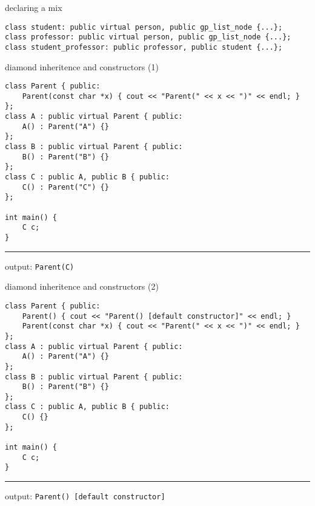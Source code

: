 \begin{frame}[fragile,label=declareMix]{declaring a mix}
\lstset{language=C++,style=smaller}
\begin{lstlisting}
class student: public virtual person, public gp_list_node {...};
class professor: public virtual person, public gp_list_node {...};
class student_professor: public professor, public student {...};
\end{lstlisting}
\end{frame}

\begin{frame}[fragile,label=diamondConstruct1]{diamond inheritence and constructors (1)}
\begin{lstlisting}
class Parent { public:
    Parent(const char *x) { cout << "Parent(" << x << ")" << endl; }
};
class A : public virtual Parent { public:
    A() : Parent("A") {}
};
class B : public virtual Parent { public:
    B() : Parent("B") {}
}; 
class C : public A, public B { public:
    C() : Parent("C") {}
}; 

int main() {
    C c;
}
\end{lstlisting}
\hrule
output: \texttt{Parent(C)}
\end{frame}

\begin{frame}[fragile,label=diamondConstruct2]{diamond inheritence and constructors (2)}
\begin{lstlisting}
class Parent { public:
    Parent() { cout << "Parent() [default constructor]" << endl; }
    Parent(const char *x) { cout << "Parent(" << x << ")" << endl; }
};
class A : public virtual Parent { public:
    A() : Parent("A") {}
};
class B : public virtual Parent { public:
    B() : Parent("B") {}
}; 
class C : public A, public B { public:
    C() {}
}; 

int main() {
    C c;
}
\end{lstlisting}
\hrule
output: \texttt{Parent() [default constructor]}
\end{frame}
